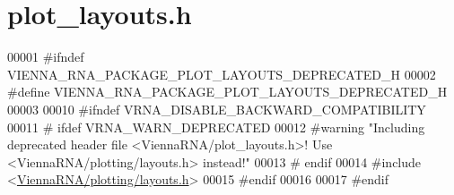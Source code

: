 \hypertarget{plot__layouts_8h_source}{}\section{plot\+\_\+layouts.\+h}
\label{plot__layouts_8h_source}

\begin{DoxyCode}
00001 \textcolor{preprocessor}{#ifndef VIENNA\_RNA\_PACKAGE\_PLOT\_LAYOUTS\_DEPRECATED\_H}
00002 \textcolor{preprocessor}{#define VIENNA\_RNA\_PACKAGE\_PLOT\_LAYOUTS\_DEPRECATED\_H}
00003 
00010 \textcolor{preprocessor}{#ifndef VRNA\_DISABLE\_BACKWARD\_COMPATIBILITY}
00011 \textcolor{preprocessor}{# ifdef VRNA\_WARN\_DEPRECATED}
00012 \textcolor{preprocessor}{#warning "Including deprecated header file <ViennaRNA/plot\_layouts.h>! Use <ViennaRNA/plotting/layouts.h>
       instead!"}
00013 \textcolor{preprocessor}{# endif}
00014 \textcolor{preprocessor}{#include <\hyperlink{layouts_8h}{ViennaRNA/plotting/layouts.h}>}
00015 \textcolor{preprocessor}{#endif}
00016 
00017 \textcolor{preprocessor}{#endif}
\end{DoxyCode}
